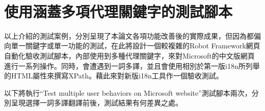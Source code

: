 \hspace*{\fill} \\
\\ \hspace*{\fill} \\
\\ \hspace*{\fill} \\
\\ \hspace*{\fill} \\
\\ \hspace*{\fill} \\
\\ \hspace*{\fill} \\
\\ \hspace*{\fill} \\
\section{使用涵蓋多項代理關鍵字的測試腳本}
以上介紹的測試案例，分別呈現了本論文各項功能改善後的實際成果，但因為都偏向單一關鍵字或單一功能的測試，在此將設計一個較複雜的Robot Framework網頁自動化驗收測試腳本，內部使用到多種代理關鍵字，來對Microsoft的中文版網頁進行一系列操作。同時，會遭遇到一詞多譯，並且會使用相別於第一版i18n所列舉的HTML屬性來撰寫XPath。藉此來對新版i18n工具作一個驗收測試。

以下將執行“Test multiple user behaviors on Microsoft website”測試腳本兩次，分別呈現選擇一詞多譯翻譯前後，測試結果有何差異之處。

